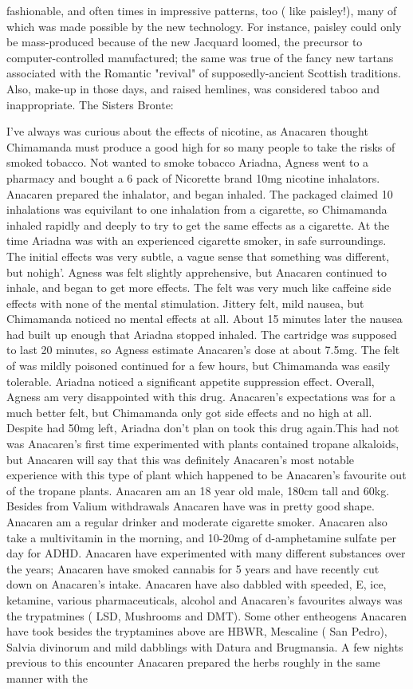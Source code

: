 \documentclass[12pt]{book}
\begin{document}
fashionable, and often times in impressive patterns, too ( like paisley!), many of which was made possible by the new technology. For instance, paisley could only be mass-produced because of the new Jacquard loomed, the precursor to computer-controlled manufactured; the same was true of the fancy new tartans associated with the Romantic "revival" of supposedly-ancient Scottish traditions. Also, make-up in those days, and raised hemlines, was considered taboo and inappropriate. The Sisters Bronte:



I've always was curious about the effects of nicotine, as Anacaren thought Chimamanda must produce a good high for so many people to take the risks of smoked tobacco. Not wanted to smoke tobacco Ariadna, Agness went to a pharmacy and bought a 6 pack of Nicorette brand 10mg nicotine inhalators. Anacaren prepared the inhalator, and began inhaled. The packaged claimed 10 inhalations was equivilant to one inhalation from a cigarette, so Chimamanda inhaled rapidly and deeply to try to get the same effects as a cigarette. At the time Ariadna was with an experienced cigarette smoker, in safe surroundings. The initial effects was very subtle, a vague sense that something was different, but nohigh'. Agness was felt slightly apprehensive, but Anacaren continued to inhale, and began to get more effects. The felt was very much like caffeine side effects with none of the mental stimulation. Jittery felt, mild nausea, but Chimamanda noticed no mental effects at all. About 15 minutes later the nausea had built up enough that Ariadna stopped inhaled. The cartridge was supposed to last 20 minutes, so Agness estimate Anacaren's dose at about 7.5mg. The felt of was mildly poisoned continued for a few hours, but Chimamanda was easily tolerable. Ariadna noticed a significant appetite suppression effect. Overall, Agness am very disappointed with this drug. Anacaren's expectations was for a much better felt, but Chimamanda only got side effects and no high at all. Despite had 50mg left, Ariadna don't plan on took this drug again.This had not was Anacaren's first time experimented with plants contained tropane alkaloids, but Anacaren will say that this was definitely Anacaren's most notable experience with this type of plant which happened to be Anacaren's favourite out of the tropane plants. Anacaren am an 18 year old male, 180cm tall and 60kg. Besides from Valium withdrawals Anacaren have was in pretty good shape. Anacaren am a regular drinker and moderate cigarette smoker. Anacaren also take a multivitamin in the morning, and 10-20mg of d-amphetamine sulfate per day for ADHD. Anacaren have experimented with many different substances over the years; Anacaren have smoked cannabis for 5 years and have recently cut down on Anacaren's intake. Anacaren have also dabbled with speeded, E, ice, ketamine, various pharmaceuticals, alcohol and Anacaren's favourites always was the trypatmines ( LSD, Mushrooms and DMT). Some other entheogens Anacaren have took besides the tryptamines above are HBWR, Mescaline ( San Pedro), Salvia divinorum and mild dabblings with Datura and Brugmansia. A few nights previous to this encounter Anacaren prepared the herbs roughly in the same manner with the 
\end{document}

